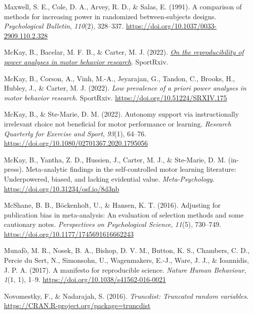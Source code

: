 \documentclass[
  doc, donotrepeattitle,floatsintext]{apa7}
\newlength{\cslhangindent}
\newlength{\cslentryspacingunit} %
\newenvironment{CSLReferences}[2] %
 {%
  \setlength{\parindent}{0pt}
  \ifodd #1
  \let\oldpar\par
  \def\par{\hangindent=\cslhangindent\oldpar}
  \fi
  \setlength{\parskip}{#2\cslentryspacingunit}
 }%
 {}
\begin{document}
\begin{CSLReferences}{1}{0}
\leavevmode{}%
Maxwell, S. E., Cole, D. A., Arvey, R. D., \& Salas, E. (1991). A comparison of methods for increasing power in randomized between-subjects designs. \emph{Psychological Bulletin}, \emph{110}(2), 328--337. \url{https://doi.org/10.1037/0033-2909.110.2.328}

\leavevmode{}%
McKay, B., Bacelar, M. F. B., \& Carter, M. J. (2022). \emph{\href{}{On the reproducibility of power analyses in motor behavior research}}. {SportRxiv}.

\leavevmode{}%
McKay, B., Corson, A., Vinh, M.-A., Jeyarajan, G., Tandon, C., Brooks, H., Hubley, J., \& Carter, M. J. (2022). \emph{Low prevalence of a priori power analyses in motor behavior research}. {SportRxiv}. \url{https://doi.org/10.51224/SRXIV.175}

\leavevmode{}%
McKay, B., \& Ste-Marie, D. M. (2022). Autonomy support via instructionally irrelevant choice not beneficial for motor performance or learning. \emph{Research Quarterly for Exercise and Sport}, \emph{93}(1), 64--76. \url{https://doi.org/10.1080/02701367.2020.1795056}

\leavevmode{}%
McKay, B., Yantha, Z. D., Hussien, J., Carter, M. J., \& Ste-Marie, D. M. (in-press). Meta-analytic findings in the self-controlled motor learning literature: Underpowered, biased, and lacking evidential value. \emph{Meta-Psychology}. \url{https://doi.org/10.31234/osf.io/8d3nb}

\leavevmode{}%
McShane, B. B., Böckenholt, U., \& Hansen, K. T. (2016). Adjusting for publication bias in meta-analysis: An evaluation of selection methods and some cautionary notes. \emph{Perspectives on Psychological Science}, \emph{11}(5), 730--749. \url{https://doi.org/10.1177/1745691616662243}

\leavevmode{}%
Munafò, M. R., Nosek, B. A., Bishop, D. V. M., Button, K. S., Chambers, C. D., Percie du Sert, N., Simonsohn, U., Wagenmakers, E.-J., Ware, J. J., \& Ioannidis, J. P. A. (2017). A manifesto for reproducible science. \emph{Nature Human Behaviour}, \emph{1}(1, 1), 1--9. \url{https://doi.org/10.1038/s41562-016-0021}

\leavevmode{}%
Novomestky, F., \& Nadarajah, S. (2016). \emph{Truncdist: Truncated random variables}. \url{https://CRAN.R-project.org/package=truncdist}


\end{CSLReferences}
\end{document}

